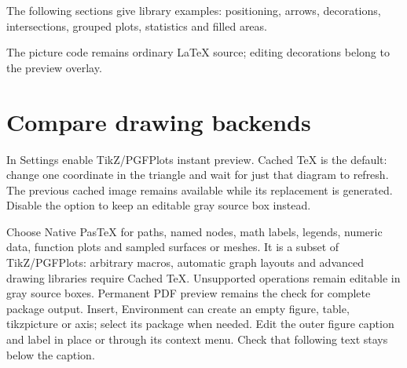 \documentclass{article}
\begin{document}
\begin{center}
\end{center}

\begin{center}
\end{center}

The following sections give library examples: positioning, arrows,
decorations, intersections, grouped plots, statistics and filled areas.

The picture code remains ordinary \LaTeX{} source; editing decorations belong to the preview overlay.

\section{Compare drawing backends}
In Settings enable TikZ/PGFPlots instant preview. Cached TeX is the default:
change one coordinate in the triangle and wait for just that diagram to refresh.
The previous cached image remains available while its replacement is generated.
Disable the option to keep an editable gray source box instead.

Choose Native PasTeX for paths, named nodes, math labels, legends, numeric data,
function plots and sampled surfaces or meshes. It is a subset of TikZ/PGFPlots:
arbitrary macros, automatic graph layouts and advanced drawing libraries require
Cached TeX. Unsupported operations remain editable in gray source boxes.
Permanent PDF preview remains the check for complete package output.
Insert, Environment can create an empty figure, table, tikzpicture or axis;
select its package when needed. Edit the outer figure caption and label in place
or through its context menu. Check that following text stays below the caption.
\end{document}
